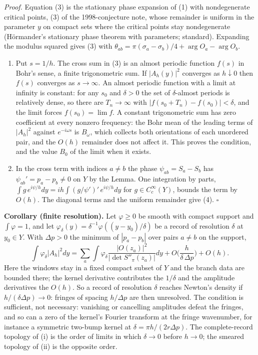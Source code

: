 \documentclass[11pt,a4paper]{article}
\begin{document}
\emph{Proof.} Equation (3) is the stationary phase expansion of (1) with
nondegenerate critical points, (3) of the 1998-conjecture note, whose
remainder is uniform in the parameter \(y\) on compact sets where the
critical points stay nondegenerate (Hörmander's stationary phase theorem
with parameters; standard). Expanding the modulus squared gives (3) with
\(\theta_{ab}=\pi(\sigma_a-\sigma_b)/4+\arg O_a-\arg O_b\).

\begin{enumerate}
\def\labelenumi{(\roman{enumi})}
\item
  Put \(s=1/h\). The cross sum in (3) is an almost periodic function
  \(f(s)\) in Bohr's sense, a finite trigonometric sum. If
  \(|A_h(y)|^2\) converges as \(h\downarrow0\) then \(f(s)\) converges
  as \(s\to\infty\). An almost periodic function with a limit at
  infinity is constant: for any \(s_0\) and \(\delta>0\) the set of
  \(\delta\)-almost periods is relatively dense, so there are
  \(T_n\to\infty\) with \(|f(s_0+T_n)-f(s_0)|<\delta\), and the limit
  forces \(f(s_0)=\lim f\). A constant trigonometric sum has zero
  coefficient at every nonzero frequency: the Bohr mean of the leading
  terms of \(|A_h|^2\) against \(e^{-i\omega s}\) is \(B_\omega\), which
  collects both orientations of each unordered pair, and the \(O(h)\)
  remainder does not affect it. This proves the condition, and the value
  \(B_0\) of the limit when it exists.
\item
  In the cross term with indices \(a\neq b\) the phase
  \(\psi_{ab}=S_a-S_b\) has \(\psi_{ab}'=p_a-p_b\neq0\) on \(Y\) by the
  Lemma. One integration by parts,
  \(\int g\,e^{i\psi/h}dy=ih\int (g/\psi')'\,e^{i\psi/h}dy\) for
  \(g\in C_c^\infty(Y)\), bounds the term by \(O(h)\). The diagonal
  terms and the uniform remainder give (4). \(\square\)
\end{enumerate}

\textbf{Corollary (finite resolution).} Let \(\varphi\ge0\) be smooth
with compact support and \(\int\varphi=1\), and let
\(\varphi_\delta(y)=\delta^{-1}\varphi((y-y_0)/\delta)\) be a record of
resolution \(\delta\) at \(y_0\in Y\). With \(\Delta p>0\) the minimum
of \(|p_a-p_b|\) over pairs \(a\ne b\) on the support,
\[\int\varphi_\delta|A_h|^2dy=\sum_a\int\varphi_\delta
\frac{|O(z_a)|^2}{|\det S''_\pi(z_a)|}dy
+O\Big(\frac{h}{\delta\,\Delta p}\Big)+O(h).\tag{4'}\] Here the windows
stay in a fixed compact subset of \(Y\) and the branch data are bounded
there; the kernel derivative contributes the \(1/\delta\) and the
amplitude derivatives the \(O(h)\). So a record of resolution \(\delta\)
reaches Newton's density if \(h/(\delta\Delta p)\to0\): fringes of
spacing \(h/\Delta p\) are then unresolved. The condition is sufficient,
not necessary: vanishing or cancelling amplitudes defeat the fringes,
and so can a zero of the kernel's Fourier transform at the fringe
wavenumber, for instance a symmetric two-bump kernel at
\(\delta=\pi h/(2r\Delta p)\). The complete-record topology of (i) is
the order of limits in which \(\delta\to0\) before \(h\to0\); the
smeared topology of (ii) is the opposite order.
\end{document}
